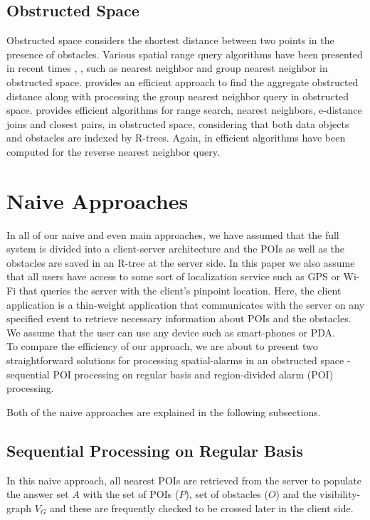 \documentclass{sig-alternate}
\begin{document}
\subsection{Obstructed Space} 
Obstructed space considers the shortest distance between two points in the presence of obstacles. Various spatial range query algorithms have been presented in recent times \cite{obst1}, \cite{obst2}, \cite{ognn} such as nearest neighbor and group nearest neighbor in obstructed space.\cite{ognn} provides an efficient approach to find the aggregate obstructed distance along with processing the group nearest neighbor query in obstructed space. \cite{obst1} provides efficient algorithms for range search, nearest neighbors, e-distance joins and closest pairs, in obstructed space, considering that both data objects and obstacles are indexed by R-trees. Again, in \cite{obst2} efficient algorithms have been computed for the reverse nearest neighbor query.
\\

\section{Naive Approaches}
In all of our naive and even main approaches, we have assumed that the full system is divided into a client-server architecture and the POIs as well as the obstacles are saved in an R-tree at the server side. In this paper we also assume that all users have access to some sort of localization service such as GPS or Wi-Fi that queries the server with the client's pinpoint location. Here, the client application is a thin-weight application that communicates with the server on any specified event to retrieve necessary information about POIs and the obstacles. We assume that the user can use any device such as smart-phones or PDA.\\

To compare the efficiency of our approach, we are about to present two straightforward solutions for processing spatial-alarms in an obstructed space - sequential POI processing on regular basis and region-divided alarm (POI) processing. 

Both of the naive approaches are explained in the following subsections.


\subsection{Sequential Processing on Regular Basis}
In this naive approach, all nearest POIs are retrieved from the server to populate the answer set $A$ with the set of POIs ($P$), set of obstacles ($O$) and the visibility-graph $V_G$ and these are frequently checked to be crossed later in the client side.\\
\end{document}

